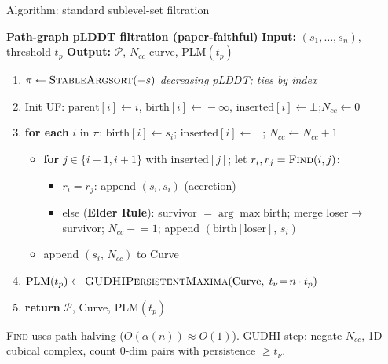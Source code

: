 \documentclass[aspectratio=169, 10pt]{beamer}
\begin{document}
\begin{frame}{Algorithm: standard sublevel-set filtration}
  \begin{block}{\footnotesize\bfseries Path-graph pLDDT filtration (paper-faithful)}
  \footnotesize
  \textbf{Input:} $(s_1,\ldots,s_n)$, threshold $t_p$\quad
  \textbf{Output:} $\mathcal{P}$, $N_{cc}$-curve, PLM$(t_p)$
  \begin{enumerate}\setlength{\itemsep}{1pt}\setlength{\parskip}{0pt}
    \item $\pi \gets \textsc{StableArgsort}(-s)$ \hfill\textit{decreasing pLDDT; ties by index}
    \item Init UF: $\mathrm{parent}[i]\!\gets\!i$, $\mathrm{birth}[i]\!\gets\!-\infty$, $\mathrm{inserted}[i]\!\gets\!\bot$;\quad $N_{cc}\!\gets\!0$
    \item \textbf{for each} $i$ in $\pi$:\;
          $\mathrm{birth}[i]\!\gets\!s_i$;\; $\mathrm{inserted}[i]\!\gets\!\top$;\; $N_{cc}\!\gets\!N_{cc}+1$
          \begin{itemize}\setlength{\itemsep}{0pt}
            \item \textbf{for} $j\in\{i{-}1,i{+}1\}$ with $\mathrm{inserted}[j]$; let $r_i,r_j=\textsc{Find}(i,j)$:
            \begin{itemize}\setlength{\itemsep}{0pt}
              \item $r_i=r_j$: append $(s_i,s_i)$ \hfill(accretion)
              \item else (\textbf{Elder Rule}): survivor $=\arg\max\mathrm{birth}$;\;
                    merge loser$\to$survivor;\; $N_{cc}\!-\!=\!1$;\;
                    append $(\mathrm{birth}[\text{loser}],\,s_i)$
            \end{itemize}
            \item append $(s_i,\,N_{cc})$ to Curve
          \end{itemize}
    \item $\mathrm{PLM}(t_p)\gets\textsc{GUDHIPersistentMaxima}(\text{Curve},\;t_\nu\!=\!n\cdot t_p)$
    \item \textbf{return} $\mathcal{P}$, Curve, PLM$(t_p)$
  \end{enumerate}
  \end{block}
  \vspace{2pt}
  {\footnotesize \textsc{Find} uses path-halving ($O(\alpha(n))\approx O(1)$).
  GUDHI step: negate $N_{cc}$, 1D cubical complex, count 0-dim pairs with persistence $\geq t_\nu$.}
\end{frame}
\end{document}
